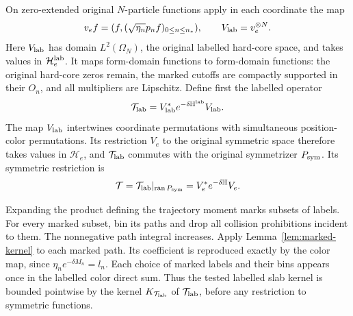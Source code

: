 On zero-extended original $N$-particle functions apply
in each coordinate the map
\[
 v_e f=(f,(\sqrt{\eta_n}p_n f)_{0\le n\le n_*}),
 \qquad V_{\rm lab}=v_e^{\otimes N}.
\]
Here $V_{\rm lab}$ has domain $L^2(\Omega_N)$, the
original labelled hard-core space, and takes values in
$\mathcal H_e^{\rm lab}$.  It maps form-domain functions
to form-domain functions:
the original hard-core zeros remain, the marked cutoffs
are compactly supported in their $O_n$, and all
multipliers are Lipschitz.  Define first the labelled operator
\[
 \mathcal T_{\rm lab}
 =V_{\rm lab}^*e^{-\delta\mathbb H^{\rm lab}}V_{\rm lab}.
 \]
The map $V_{\rm lab}$ intertwines coordinate permutations
with simultaneous position-color permutations.  Its
restriction $V_e$ to the original symmetric space therefore
takes values in $\mathcal H_e$, and $\mathcal T_{\rm lab}$
commutes with the original symmetrizer $P_{\rm sym}$.
Its symmetric restriction is
\[
 \mathcal T=\mathcal T_{\rm lab}|_{\operatorname{ran}P_{\rm sym}}
           =V_e^*e^{-\delta\mathbb H}V_e.
\]

Expanding the product defining the trajectory moment marks
subsets of labels.  For every marked subset, bin its paths
and drop all collision prohibitions incident to them.
The nonnegative path integral increases.  Apply
Lemma~\ref{lem:marked-kernel} to each marked path.
Its coefficient is reproduced exactly by the color map,
since $\eta_n e^{-\delta M_n}=l_n$.
Each choice of marked labels and their bins appears once
in the labelled color direct sum.  Thus the tested labelled
slab kernel is bounded pointwise by the kernel
$K_{\mathcal T_{\rm lab}}$ of $\mathcal T_{\rm lab}$,
before any restriction to symmetric functions.


